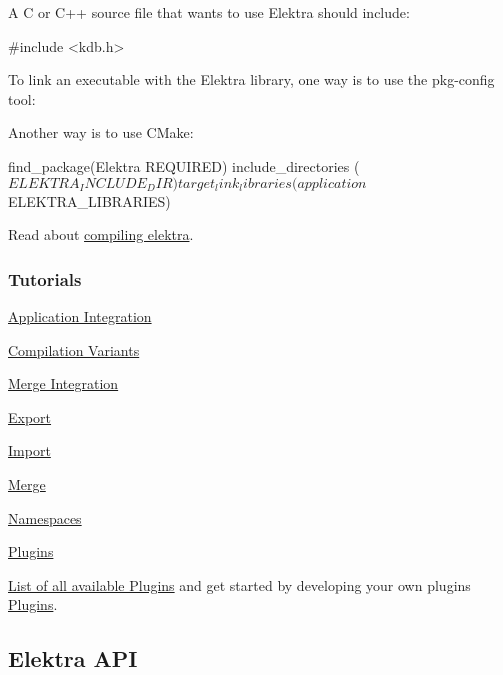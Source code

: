 A C or C++ source file that wants to use Elektra should include\+: \begin{DoxyVerb}    #include <kdb.h>
\end{DoxyVerb}


To link an executable with the Elektra library, one way is to use the {\ttfamily pkg-\/config} tool\+: 


Another way is to use C\+Make\+: \begin{DoxyVerb}    find_package(Elektra REQUIRED)
    include_directories (${ELEKTRA_INCLUDE_DIR})
    target_link_libraries (application ${ELEKTRA_LIBRARIES})
\end{DoxyVerb}


Read about \hyperlink{doc_COMPILE_md}{compiling elektra}.

\subsubsection*{Tutorials}


\begin{DoxyItemize}
\item \hyperlink{doc_tutorials_application-integration_md}{Application Integration}
\item \hyperlink{doc_tutorials_compilation-variants_md}{Compilation Variants}
\item \hyperlink{doc_tutorials_elektra-merge-integration_md}{Merge Integration}
\item \hyperlink{doc_tutorials_export_md}{Export}
\item \hyperlink{doc_tutorials_import_md}{Import}
\item \hyperlink{doc_tutorials_merge_md}{Merge}
\item \hyperlink{doc_tutorials_namespaces_md}{Namespaces}
\item \hyperlink{doc_tutorials_plugins_md}{Plugins}
\end{DoxyItemize}

\hyperlink{md_src_plugins_README_src_plugins_README_md}{List of all available Plugins} and get started by developing your own plugins \hyperlink{group__plugin}{Plugins}.

\subsection*{Elektra A\+P\+I}

